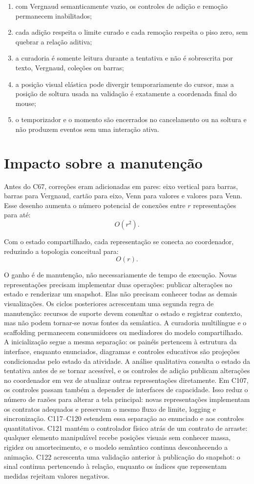 \documentclass[12pt,a4paper]{article}
\begin{document}
\begin{enumerate}[noitemsep]
  \item com Vergnaud semanticamente vazio, os controles de adição e remoção permanecem inabilitados;
  \item cada adição respeita o limite curado e cada remoção respeita o piso zero, sem quebrar a relação aditiva;
  \item a curadoria é somente leitura durante a tentativa e não é sobrescrita por texto, Vergnaud, coleções ou barras;
  \item a posição visual elástica pode divergir temporariamente do cursor, mas a posição de soltura usada na validação é exatamente a coordenada final do mouse;
  \item o temporizador e o momento são encerrados no cancelamento ou na soltura e não produzem eventos sem uma interação ativa.
\end{enumerate}

\section{Impacto sobre a manutenção}

Antes do C67, correções eram adicionadas em pares: eixo vertical para barras, barras para Vergnaud, cartão para eixo, Venn para valores e valores para Venn. Esse desenho aumenta o número potencial de conexões entre $r$ representações para até:
\[
O(r^2).
\]

Com o estado compartilhado, cada representação se conecta ao coordenador, reduzindo a topologia conceitual para:
\[
O(r).
\]

O ganho é de manutenção, não necessariamente de tempo de execução. Novas representações precisam implementar duas operações: publicar alterações no estado e renderizar um snapshot. Elas não precisam conhecer todas as demais visualizações. Os ciclos posteriores acrescentam uma segunda regra de manutenção: recursos de suporte devem consultar o estado e registrar contexto, mas não podem tornar-se novas fontes da semântica. A curadoria multilíngue e o scaffolding permanecem consumidores ou mediadores do modelo compartilhado. A inicialização segue a mesma separação: os painéis pertencem à estrutura da interface, enquanto enunciados, diagramas e controles educativos são projeções condicionadas pelo estado da atividade. A análise qualitativa consulta o estado da tentativa antes de se tornar acessível, e os controles de adição publicam alterações no coordenador em vez de atualizar outras representações diretamente. Em C107, os controles passam também a depender de interfaces de capacidade. Isso reduz o número de razões para alterar a tela principal: novas representações implementam os contratos adequados e preservam o mesmo fluxo de limite, logging e sincronização. C117--C120 estendem essa separação ao enunciado e aos controles quantitativos. C121 mantém o controlador físico atrás de um contrato de arraste: qualquer elemento manipulável recebe posições visuais sem conhecer massa, rigidez ou amortecimento, e o modelo semântico continua desconhecendo a animação. C122 acrescenta uma validação anterior à publicação do snapshot: o sinal continua pertencendo à relação, enquanto os índices que representam medidas rejeitam valores negativos.
\end{document}
